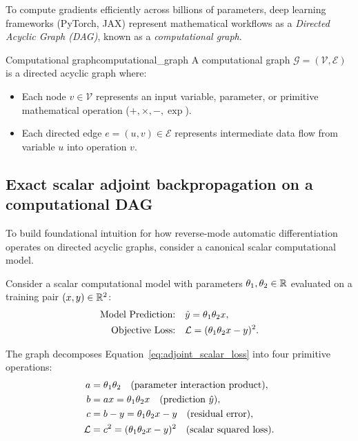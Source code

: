 \documentclass[../../main.tex]{subfiles}
\begin{document}
To compute gradients efficiently across billions of parameters, deep learning frameworks (PyTorch, JAX) represent mathematical workflows as a \emph{Directed Acyclic Graph (DAG)}, known as a \emph{computational graph}.

\begin{definition}{Computational graph}{computational_graph}
A computational graph $\mathcal{G} = (\mathcal{V}, \mathcal{E})$ is a directed acyclic graph where:
\begin{itemize}
    \item Each node $v \in \mathcal{V}$ represents an input variable, parameter, or primitive mathematical operation ($+, \times, -, \exp$).
    \item Each directed edge $e = (u, v) \in \mathcal{E}$ represents intermediate data flow from variable $u$ into operation $v$.
\end{itemize}
\end{definition}

\subsection{Exact scalar adjoint backpropagation on a computational DAG}
To build foundational intuition for how reverse-mode automatic differentiation operates on directed acyclic graphs, consider a canonical scalar computational model.

Consider a scalar computational model with parameters $\theta_1, \theta_2 \in \mathbb{R}$ evaluated on a training pair $(x, y) \in \mathbb{R}^2$:
\begin{align}
\text{Model Prediction:} \quad &\hat{y} = \theta_1 \theta_2 x, \label{eq:adjoint_scalar_model} \\
\text{Objective Loss:} \quad &\mathcal{L} = (\theta_1 \theta_2 x - y)^2. \label{eq:adjoint_scalar_loss}
\end{align}

The graph decomposes Equation~\eqref{eq:adjoint_scalar_loss} into four primitive operations:
\begin{align}
a &= \theta_1 \theta_2 \quad (\text{parameter interaction product}), \label{eq:fwd_a} \\
b &= a x = \theta_1 \theta_2 x \quad (\text{prediction } \hat{y}), \label{eq:fwd_b} \\
c &= b - y = \theta_1 \theta_2 x - y \quad (\text{residual error}), \label{eq:fwd_c} \\
\mathcal{L} &= c^2 = (\theta_1 \theta_2 x - y)^2 \quad (\text{scalar squared loss}). \label{eq:fwd_L}
\end{align}
\end{document}
